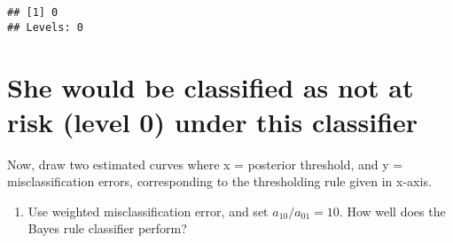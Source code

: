 \documentclass[]{article}
\newenvironment{Shaded}{\begin{snugshade}}{\end{snugshade}}
\newcommand{\KeywordTok}[1]{\textcolor[rgb]{0.13,0.29,0.53}{\textbf{#1}}}
\newcommand{\DataTypeTok}[1]{\textcolor[rgb]{0.13,0.29,0.53}{#1}}
\newcommand{\DecValTok}[1]{\textcolor[rgb]{0.00,0.00,0.81}{#1}}
\newcommand{\FloatTok}[1]{\textcolor[rgb]{0.00,0.00,0.81}{#1}}
\newcommand{\StringTok}[1]{\textcolor[rgb]{0.31,0.60,0.02}{#1}}
\newcommand{\ControlFlowTok}[1]{\textcolor[rgb]{0.13,0.29,0.53}{\textbf{#1}}}
\newcommand{\OperatorTok}[1]{\textcolor[rgb]{0.81,0.36,0.00}{\textbf{#1}}}
\newcommand{\NormalTok}[1]{#1}
\providecommand{\tightlist}{%
  \setlength{\itemsep}{0pt}\setlength{\parskip}{0pt}}
\begin{document}
\begin{verbatim}
## [1] 0
## Levels: 0
\end{verbatim}

\section{She would be classified as not at risk (level 0) under this
classifier}\label{she-would-be-classified-as-not-at-risk-level-0-under-this-classifier}

Now, draw two estimated curves where x = posterior threshold, and y =
misclassification errors, corresponding to the thresholding rule given
in x-axis.

\begin{enumerate}
\def\labelenumi{\alph{enumi}.}
\setcounter{enumi}{3}
\tightlist
\item
  Use weighted misclassification error, and set \(a_{10}/a_{01}=10\).
  How well does the Bayes rule classifier perform?
\end{enumerate}

\begin{Shaded}
\end{Shaded}
\end{document}
